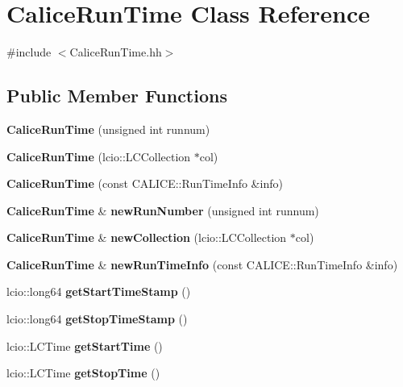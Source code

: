 \section{Calice\-Run\-Time Class Reference}
\label{classCaliceRunTime}


{\ttfamily \#include $<$Calice\-Run\-Time.\-hh$>$}

\subsection*{Public Member Functions}
\begin{DoxyCompactItemize}
\item 
{\bfseries Calice\-Run\-Time} (unsigned int runnum)\label{classCaliceRunTime_a6ad65a2cf8e7c6bf1f2f69b6741241ff}

\item 
{\bfseries Calice\-Run\-Time} (lcio\-::\-L\-C\-Collection $\ast$col)\label{classCaliceRunTime_aeac6c095021937d422ce67e714f5401c}

\item 
{\bfseries Calice\-Run\-Time} (const C\-A\-L\-I\-C\-E\-::\-Run\-Time\-Info \&info)\label{classCaliceRunTime_aac24a43818ea24805c2bc7e2d0497fce}

\item 
{\bf Calice\-Run\-Time} \& {\bfseries new\-Run\-Number} (unsigned int runnum)\label{classCaliceRunTime_a2e35de15f2e55165e01ab0d71792c077}

\item 
{\bf Calice\-Run\-Time} \& {\bfseries new\-Collection} (lcio\-::\-L\-C\-Collection $\ast$col)\label{classCaliceRunTime_ae51fa3bbfdc69b7d768ecd24215e53fc}

\item 
{\bf Calice\-Run\-Time} \& {\bfseries new\-Run\-Time\-Info} (const C\-A\-L\-I\-C\-E\-::\-Run\-Time\-Info \&info)\label{classCaliceRunTime_ae4a0ae43b53ec5bb41bf6713993f79e4}

\item 
lcio\-::long64 {\bfseries get\-Start\-Time\-Stamp} ()\label{classCaliceRunTime_aabc1e79a5f7c496ded0bd6d577a9d876}

\item 
lcio\-::long64 {\bfseries get\-Stop\-Time\-Stamp} ()\label{classCaliceRunTime_aab8c4aa2cb72130ffc4146fd323c2d2a}

\item 
lcio\-::\-L\-C\-Time {\bfseries get\-Start\-Time} ()\label{classCaliceRunTime_a523e83d7f364b53974b9b1b777769cbf}

\item 
lcio\-::\-L\-C\-Time {\bfseries get\-Stop\-Time} ()\label{classCaliceRunTime_a34fa70b4ab5159cbde3d69820e2613ad}

\end{DoxyCompactItemize}


